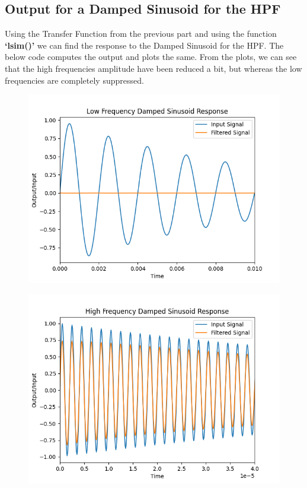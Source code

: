 \documentclass[12pt, a4paper]{report}
\begin{document}
\subsection{Output for a Damped Sinusoid for the HPF}
Using the Transfer Function from the previous part and using the function \textbf{‘lsim()’} we can find the response to the Damped Sinusoid for the HPF. The below code computes the output and plots the same. From the plots, we can see that the high frequencies amplitude have been reduced a bit, but whereas the low frequencies are completely suppressed.
\noindent

\begin{figure}[h!]
    \centering
    \includegraphics[scale=0.75]{fig4.png} 
    \caption{}
    \label{fig:my_label}
\end{figure}
\vspace{100mm}
\begin{figure}[h!]
    \centering
    \includegraphics[scale=0.75]{fig5.png} 
    \caption{}
    \label{fig:my_label}
\end{figure}
\end{document}
